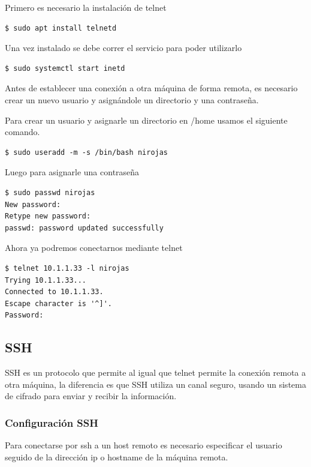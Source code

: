 \documentclass[12pt]{article}
\begin{document}
Primero es necesario la instalación de telnet
\begin{lstlisting}[frame=single]
$ sudo apt install telnetd
\end{lstlisting}

Una vez instalado se debe correr el servicio para poder utilizarlo
\begin{lstlisting}[frame=single]
$ sudo systemctl start inetd
\end{lstlisting}

Antes de establecer una conexión a otra máquina de forma remota, es necesario crear un nuevo usuario y asignándole un directorio y una contraseña.

Para crear un usuario y asignarle un directorio en /home usamos el siguiente comando.

\begin{lstlisting}[frame=single]
$ sudo useradd -m -s /bin/bash nirojas
\end{lstlisting}

Luego para asignarle una contraseña 

\begin{lstlisting}[frame=single]
$ sudo passwd nirojas
New password:
Retype new password:
passwd: password updated successfully
\end{lstlisting}

Ahora ya podremos conectarnos mediante telnet
\begin{lstlisting}[frame=single]
$ telnet 10.1.1.33 -l nirojas
Trying 10.1.1.33...
Connected to 10.1.1.33.
Escape character is '^]'.
Password:
\end{lstlisting}

\subsection{SSH}

SSH es un protocolo que permite al igual que telnet permite la conexión remota a otra máquina, la diferencia es que SSH utiliza un canal seguro, usando un sistema de cifrado para enviar y recibir la información.\cite{ssh}

\subsubsection{Configuración SSH}

Para conectarse por ssh a un host remoto es necesario especificar el usuario seguido de la dirección ip o hostname de la máquina remota.
\end{document}
